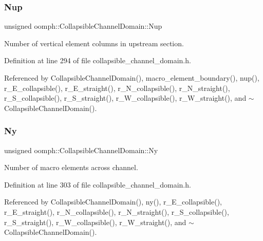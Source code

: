 \subsubsection{\texorpdfstring{Nup}{Nup}}
{\footnotesize\ttfamily unsigned oomph\+::\+Collapsible\+Channel\+Domain\+::\+Nup\hspace{0.3cm}{\ttfamily [private]}}



Number of vertical element columns in upstream section. 



Definition at line 294 of file collapsible\+\_\+channel\+\_\+domain.\+h.



Referenced by Collapsible\+Channel\+Domain(), macro\+\_\+element\+\_\+boundary(), nup(), r\+\_\+\+E\+\_\+collapsible(), r\+\_\+\+E\+\_\+straight(), r\+\_\+\+N\+\_\+collapsible(), r\+\_\+\+N\+\_\+straight(), r\+\_\+\+S\+\_\+collapsible(), r\+\_\+\+S\+\_\+straight(), r\+\_\+\+W\+\_\+collapsible(), r\+\_\+\+W\+\_\+straight(), and $\sim$\+Collapsible\+Channel\+Domain().

\mbox{\label{classoomph_1_1CollapsibleChannelDomain_a13c992ef93891493c5da50afff67d38c}} 
\subsubsection{\texorpdfstring{Ny}{Ny}}
{\footnotesize\ttfamily unsigned oomph\+::\+Collapsible\+Channel\+Domain\+::\+Ny\hspace{0.3cm}{\ttfamily [private]}}



Number of macro elements across channel. 



Definition at line 303 of file collapsible\+\_\+channel\+\_\+domain.\+h.



Referenced by Collapsible\+Channel\+Domain(), ny(), r\+\_\+\+E\+\_\+collapsible(), r\+\_\+\+E\+\_\+straight(), r\+\_\+\+N\+\_\+collapsible(), r\+\_\+\+N\+\_\+straight(), r\+\_\+\+S\+\_\+collapsible(), r\+\_\+\+S\+\_\+straight(), r\+\_\+\+W\+\_\+collapsible(), r\+\_\+\+W\+\_\+straight(), and $\sim$\+Collapsible\+Channel\+Domain().

